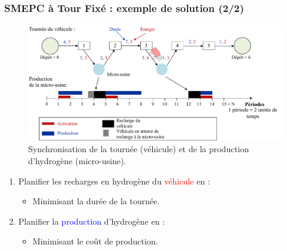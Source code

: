 \documentclass[hyperref={bookmarks=false},aspectratio=169]{beamer}
\begin{document}
\begin{frame}
\frametitle{SMEPC à Tour Fixé : exemple de solution (2/2)}



\begin{minipage}{.75\textwidth}%
\begin{figure}
    \centering
    \includegraphics[width=\textwidth]{./figures/Synchro_exemple.pdf}%
    \caption{Synchronisation de la tournée (véhicule) et de la production d'hydrogène (micro-usine).}
    \label{fig:dept}
\end{figure}
\end{minipage}%
\hfill
\pause
\begin{minipage}{.25\textwidth}%
    \begin{enumerate}
 \item  Planifier les recharges en hydrogène du \textcolor{red}{véhicule} en :
 \begin{itemize}
 \item  Minimisant la durée de la tournée.
 \end{itemize}
 \item Planifier la \textcolor{blue}{production} d'hydrogène en :
 \begin{itemize}
 \item   Minimisant le coût de production.
 \end{itemize}

 \end{enumerate}

\end{minipage}%


\end{frame}
\end{document}
